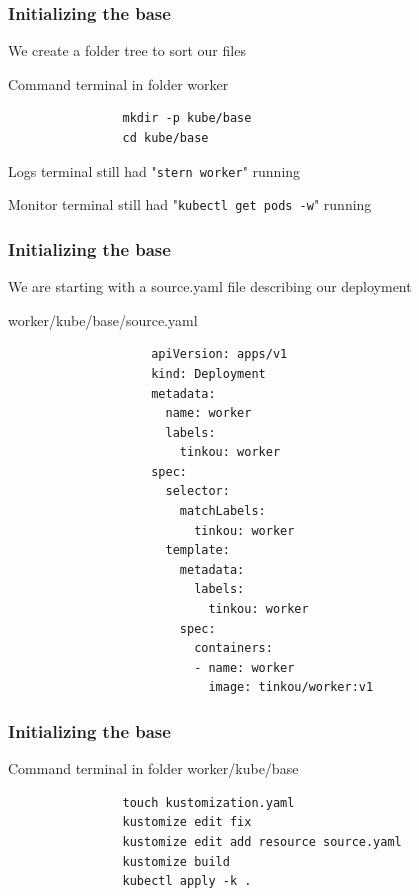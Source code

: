 	\begin{frame}[fragile]
		\frametitle{Initializing the base}
		
		We create a folder tree to sort our files
		\begin{block}{Command terminal in folder worker}
			\begin{verbatim}
				mkdir -p kube/base
				cd kube/base
			\end{verbatim}
		\end{block}
		
		\bigskip
		
		\begin{footnotesize}
			Logs terminal still had "\verb!stern worker!" running
			
			Monitor terminal still had "\verb!kubectl get pods -w!" running
		\end{footnotesize}
	\end{frame}
	
	\begin{frame}[fragile]
		\frametitle{Initializing the base}
		
		We are starting with a source.yaml file describing our deployment
		\begin{block}{worker/kube/base/source.yaml}
			\begin{tiny}
				\begin{verbatim}
					apiVersion: apps/v1
					kind: Deployment
					metadata:
					  name: worker
					  labels:
					    tinkou: worker
					spec:
					  selector:
					    matchLabels:
					      tinkou: worker
					  template:
					    metadata:
					      labels:
					        tinkou: worker
					    spec:
					      containers:
					      - name: worker
					        image: tinkou/worker:v1
				\end{verbatim}
			\end{tiny}
		\end{block}
	\end{frame}
	
	\begin{frame}[fragile]
		\frametitle{Initializing the base}
		\begin{block}{Command terminal in folder worker/kube/base}
			\begin{verbatim}
				touch kustomization.yaml
				kustomize edit fix
				kustomize edit add resource source.yaml
				kustomize build
				kubectl apply -k .
			\end{verbatim}
		\end{block}
	\end{frame}
	
